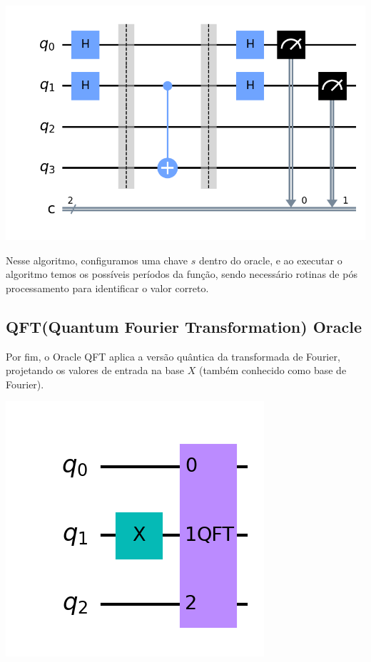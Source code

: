 \documentclass{article}
\begin{document}
\begin{center}
	\includegraphics[scale=0.3]{simons.png}
	\label{fig:simons-oracle}
\end{center}

Nesse algoritmo, configuramos uma chave $s$ dentro do oracle, e ao executar o algoritmo temos os possíveis períodos da função, sendo necessário rotinas de pós processamento para identificar o valor correto.

\subsection{QFT(Quantum Fourier Transformation) Oracle}

Por fim, o Oracle QFT aplica a versão quântica da transformada de Fourier, projetando os valores de entrada na base $X$ (também conhecido como base de Fourier).


\begin{center}
	\includegraphics[scale=0.4]{QFT_1.png}
	\label{fig:QFT}
\end{center}
\end{document}
